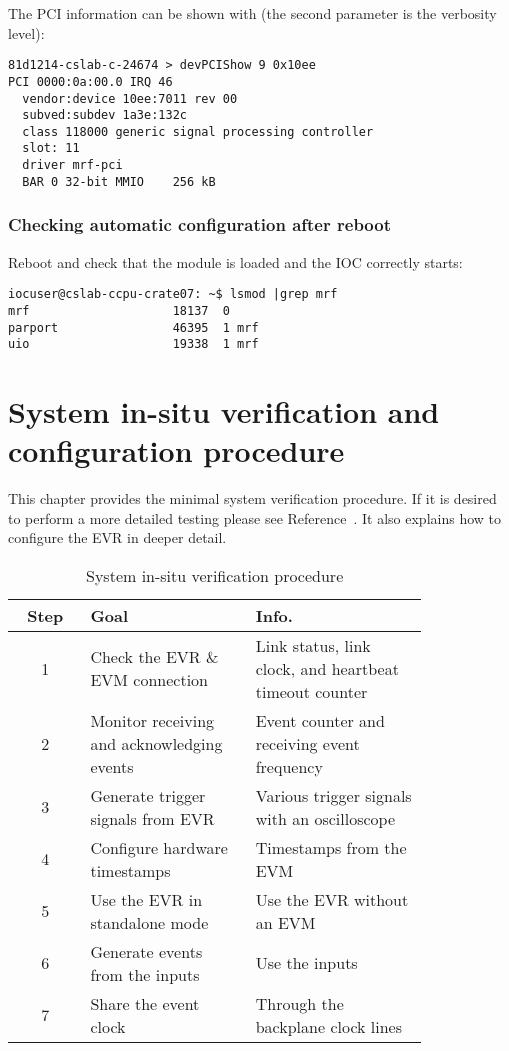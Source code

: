 \documentclass[11pt
  , a4paper
  , article
  , oneside
  , showtrims
]{memoir}
\begin{document}
{The PCI information can be shown with (the second parameter is the verbosity level):
\begin{lstlisting}
81d1214-cslab-c-24674 > devPCIShow 9 0x10ee
PCI 0000:0a:00.0 IRQ 46
  vendor:device 10ee:7011 rev 00
  subved:subdev 1a3e:132c
  class 118000 generic signal processing controller
  slot: 11
  driver mrf-pci
  BAR 0 32-bit MMIO    256 kB
\end{lstlisting}

\subsection{Checking automatic configuration after reboot}
Reboot and check that the module is loaded and the IOC correctly starts:
\begin{lstlisting}[style=termstyle]
iocuser@cslab-ccpu-crate07: ~$ lsmod |grep mrf
mrf                    18137  0
parport                46395  1 mrf
uio                    19338  1 mrf
\end{lstlisting}



\chapter{System in-situ verification and configuration procedure}
This chapter provides the minimal system verification procedure. If it is desired to perform a more detailed testing please see Reference~\citep[see][p14]{EVR-USER-GUIDE}. It also explains how to configure the EVR in deeper detail.

\begin{table}[!htb]
  \centering
  \begin{tabular}{c|p{0.4\linewidth}|p{0.42\linewidth}}
    \toprule
    Step & Goal                                       & Info.                                                  \\\midrule
    1    & Check the EVR \& EVM connection            & Link status, link clock, and heartbeat timeout counter \\\midrule
    2    & Monitor receiving and acknowledging events & Event counter and receiving event frequency            \\\midrule
    3    & Generate trigger signals from EVR          & Various trigger signals with an oscilloscope           \\\midrule
    4    & Configure hardware timestamps              & Timestamps from the EVM                                \\\midrule
    5    & Use the EVR in standalone mode             & Use the EVR without an EVM                             \\\midrule
    6    & Generate events from the inputs            & Use the inputs                                         \\\midrule
    7    & Share the event clock                      & Through the backplane clock lines                      \\\bottomrule
  \end{tabular}
  \caption[]{System in-situ verification procedure}
  \label{table:checklist}
\end{table}


}
\end{document}
